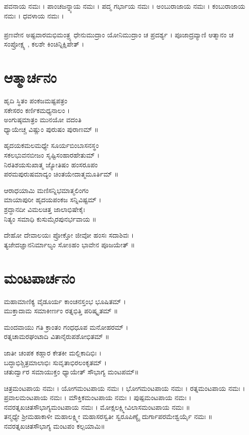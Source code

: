 ಪವನಾಯ ನಮಃ । ಪಾಂಚಜನ್ನ್ಯಾಯ ನಮಃ । ಪದ್ಮ ಗರ್ಭಾಯ ನಮಃ । ಅಂಬುರಾಜಾಯ ನಮಃ । ಕಂಬುರಾಜಾಯ ನಮಃ । ಧವಳಾಯ ನಮಃ ।\\
\\
ಪ್ರಣವೇನ ಅಷ್ಟವಾರಮಭಿಮಂತ್ರ್ಯ ಧೇನುಮುದ್ರಾಂ ಯೋನಿಮುದ್ರಾಂ ಚ ಪ್ರದರ್ಶ್ಯ ।  ಪೂಜಾದ್ರವ್ಯಾಣಿ ಆತ್ಮಾನಂ ಚ ಸಂಪ್ರೋಕ್ಷ್ಯ , ಕಲಶೇ ಕಿಂಚಿನ್ನಿಕ್ಷಿಪೇತ್ ।

\section{ಆತ್ಮಾರ್ಚನಂ}
ಹೃದಿ ಸ್ಥಿತಂ ಪಂಕಜಮಷ್ಟಪತ್ರಂ\\ ಸಕೇಸರಂ ಕರ್ಣಿಕಮಧ್ಯನಾಲಂ ।\\
ಅಂಗುಷ್ಠಮಾತ್ರಂ ಮುನಯೋ ವದಂತಿ\\ ಧ್ಯಾಯೇಚ್ಚ ವಿಷ್ಣುಂ ಪುರುಷಂ ಪುರಾಣಮ್ ॥

ಹೃದಯಕಮಲಮಧ್ಯೇ ಸೂರ್ಯಬಿಂಬಾಸನಸ್ಥಂ\\
ಸಕಲಭುವನಬೀಜಂ ಸೃಷ್ಟಿಸಂಹಾರಹೇತುಮ್ ।\\
ನಿರತಿಶಯಸುಖಾತ್ಮ ಜ್ಯೋತಿಷಂ ಹಂಸರೂಪಂ\\
ಪರಮಪುರುಷಮಾದ್ಯಂ ಚಿಂತಯೇದಾತ್ಮಮೂರ್ತಿಮ್ ॥

ಆರಾಧಯಾಮಿ ಮಣಿಸನ್ನಿಭಮಾತ್ಮಲಿಂಗಂ\\
ಮಾಯಾಪುರೀ ಹೃದಯಪಂಕಜ ಸನ್ನಿವಿಷ್ಟಮ್ ।\\
ಶ್ರದ್ಧಾನದೀ ವಿಮಲಚಿತ್ತ ಜಾಲಾಭಿಷೇಕೈಃ\\
ನಿತ್ಯಂ ಸಮಾಧಿ ಕುಸುಮೈರಪುನರ್ಭವಾಯ ॥

ದೇಹೋ ದೇವಾಲಯಃ ಪ್ರೋಕ್ತೋ ಜೀವೋ ಹಂಸಃ ಸದಾಶಿವಃ ।\\
ತ್ಯಜೇದಜ್ಞಾನನಿರ್ಮಾಲ್ಯಂ ಸೋಽಹಂ ಭಾವೇನ ಪೂಜಯೇತ್ ॥
\section{ಮಂಟಪಾರ್ಚನಂ}
ಮಹಾಮಾಣಿಕ್ಯ ವೈಡೂರ್ಯ ಕಾಂಚನಸ್ತಂಭ ಭೂಷಿತಮ್ ।\\
ಮುಕ್ತಾದಾಮ ಸಮಾಕೀರ್ಣಂ ರತ್ನಭಿತ್ತಿ ಪರಿಷ್ಕೃತಮ್ ॥

ಮಂದವಾಯು ಗತಿ ಕ್ರಾಂತಂ ಗಂಧಧೂಪ ಮನೋಹರಮ್ ।\\
ರತ್ನಚಾಮರಘಂಟಾದಿ ವಿತಾನೈರುಪಶೋಭಿತಮ್ ॥

ಜಾತೀ ಚಂಪಕ ಕಹ್ಲಾರ ಕೇತಕೀ ಮಲ್ಲಿಕಾದಿಭಿಃ ।\\
ಬದ್ಧಾಭಿಶ್ಚಿತ್ರಮಾಲಾಭಿಃ ಸುವೃತಾಭಿರಲಂಕೃತಮ್ ।\\
ಚತುರ್ದ್ವಾರ ಸಮಾಯುಕ್ತಂ ಧ್ಯಾಯೇತ್ ಸೌಭಾಗ್ಯ ಮಂಟಪಮ್॥

ಚಿತ್ರಮಂಟಪಾಯ ನಮಃ ।
ಯೋಗಮಂಟಪಾಯ ನಮಃ ।
ಭೋಗಮಂಟಪಾಯ ನಮಃ ।
ರತ್ನಮಂಟಪಾಯ ನಮಃ ।
ಪ್ರವಾಲಮಂಟಪಾಯ ನಮಃ ।
ಮೌಕ್ತಿಕಮಂಟಪಾಯ ನಮಃ ।
ಪುಷ್ಪಮಂಟಪಾಯ ನಮಃ ।
ನವರತ್ನಖಚಿತಸೌಭಾಗ್ಯಮಂಟಪಾಯ ನಮಃ ।
ಮೋಕ್ಷಲಕ್ಷ್ಮೀವಿಲಾಸಮಂಟಪಾಯ ನಮಃ ॥\\
ತನ್ಮಧ್ಯೇ ಶ್ರೀಮಹಾಕಾಳೀ ಮಹಾಲಕ್ಷ್ಮೀ ಮಹಾಸರಸ್ವತೀ ಸ್ವರೂಪಿಣ್ಯೈ ದುರ್ಗಾಪರಮೇಶ್ವರ್ಯೈ ನಮಃ ॥\\
ನವರತ್ನಖಚಿತಸೌಭಾಗ್ಯ ಮಂಟಪಂ ಕಲ್ಪಯಾಮಿ॥

